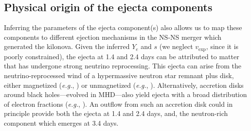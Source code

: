 \documentclass[twocolumn,twocolappendix]{aastex63}
\def\eg{{\it e.g.}}
\begin{document}
\subsection{Physical origin of the ejecta components}\label{ssc:disco-origins}

Inferring the parameters of the ejecta component(s) also allows us to map these components to different ejection mechanisms in the NS-NS merger which generated the kilonova. Given the inferred $Y_e$ and $s$ (we neglect $v_{\mathrm{exp}}$, since it is poorly constrained), the ejecta at 1.4 and 2.4 days can be attributed to matter that has undergone strong neutrino reprocessing. This ejecta can arise from the neutrino-reprocessed wind of a hypermassive neutron star remnant plus disk, either magnetized (\eg, \citealt{combi23,curtis23b}) or unmagnetized (\eg, \citealt{fujibayashi23,just23}). Alternatively, accretion disks around black holes---evolved in MHD---also yield ejecta with a broad distribution of electron fractions (\eg, \citealt{siegel18, fernandez19, christie19, miller19, just22, fahlman22, hayashi23, curtis23a}). An outflow from such an accretion disk could in principle provide both the ejecta at 1.4 and 2.4 days, and, the neutron-rich component which emerges at 3.4 days. 
 
\end{document}
